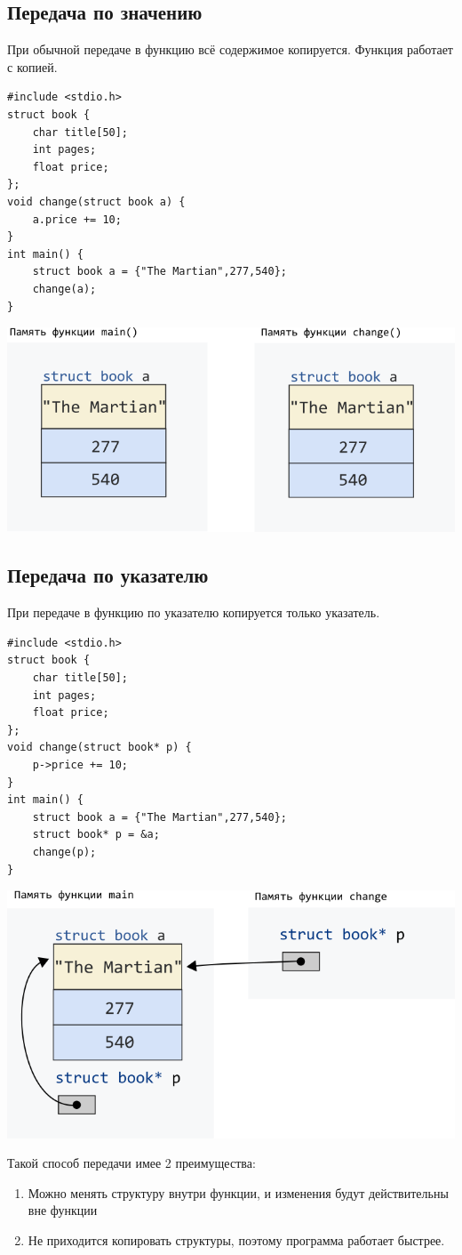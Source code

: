 \documentclass{article}
\begin{document}
\subsection*{Передача по значению}
При обычной передаче в функцию всё содержимое копируется. Функция работает с копией.
\begin{lstlisting}
#include <stdio.h>
struct book {
    char title[50];
    int pages;
    float price;
};
void change(struct book a) {
    a.price += 10;
}
int main() {
    struct book a = {"The Martian",277,540};
    change(a);
}
\end{lstlisting}
\begin{center}
\includegraphics[scale=0.6]{../images/structpassbyvalue.png}
\end{center}


\subsection*{Передача по указателю}
При передаче в функцию по указателю копируется только указатель.
\begin{lstlisting}
#include <stdio.h>
struct book {
    char title[50];
    int pages;
    float price;
};
void change(struct book* p) {
    p->price += 10;
}
int main() {
    struct book a = {"The Martian",277,540};
    struct book* p = &a;
    change(p);
}
\end{lstlisting}
\begin{center}
\includegraphics[scale=0.6]{../images/structpassbypointer.png}
\end{center}
Такой способ передачи имее 2 преимущества:
\begin{enumerate}
\item Можно менять структуру внутри функции, и изменения будут действительны вне функции
\item Не приходится копировать структуры, поэтому программа работает быстрее.
\end{enumerate}
\end{document}

